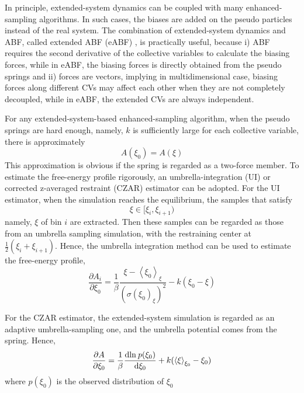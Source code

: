 In principle, extended-system dynamics can be coupled with many enhanced-sampling algorithms. In such cases, the biases are added on the pseudo particles instead of the real system. The combination of extended-system dynamics and ABF, called extended ABF (eABF) \cite{FuJCTC2016}, is practically useful, because i) ABF requires the second derivative of the collective variables to calculate the biasing forces, while in eABF, the biasing forces is directly obtained from the pseudo springs and ii) forces are vectors, implying in multidimensional case, biasing forces along different CVs may affect each other when they are not completely decoupled, while in eABF, the extended CVs are always independent.

For any extended-system-based enhanced-sampling algorithm, when the pseudo springs are hard enough, namely, $k$ is sufficiently large for each collective variable, there is approximately
\begin{equation}
	A(\xi_0)=A(\xi)
\end{equation}
This approximation is obvious if the spring is regarded as a two-force member. To estimate the free-energy profile rigorously, an umbrella-integration (UI)\cite{ZhengJCTC2012} or corrected z-averaged restraint (CZAR)\cite{LesageJPCB2017} estimator can be adopted. For the UI estimator, when the simulation reaches the equilibrium, the samples that satisfy
\begin{equation}
	\xi \in [\xi_{i}, \xi_{i+1})
\end{equation}
namely, $\xi$ of bin $i$ are extracted. Then these samples can be regarded as those from an umbrella sampling simulation, with the restraining center at $\frac{1}{2}(\xi_{i} + \xi_{i+1})$. Hence, the umbrella integration method can be used to estimate the free-energy profile,
\begin{equation}
	\frac{\partial A_{i}}{\partial \xi_{0}}=\frac{1}{\beta }\frac{\xi - \left \langle \xi_{0} \right \rangle_{\xi}}{(\sigma ( \xi_{0})_{\xi})^{2} }-k(\xi_{0} - \xi)
\end{equation}

For the CZAR estimator, the extended-system simulation is regarded as an adaptive umbrella-sampling one, and the umbrella potential comes from the spring. Hence,
\begin{equation}
	\frac{\partial A}{\partial \xi_0}=\frac{1}{\beta }\frac{\textup{dln}\:p(\xi_0)}{\textup{d} \xi_0} + k(\left \langle  \xi \right \rangle_{\xi_0}-\xi_0)
\end{equation}
where $p(\xi_0)$ is the observed distribution of $\xi_0$

